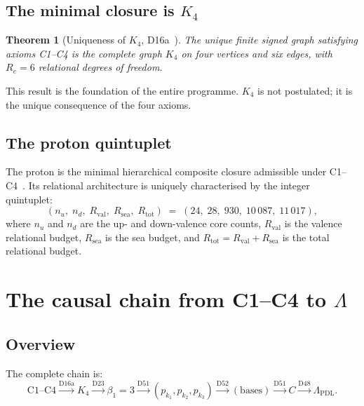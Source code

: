 \documentclass[12pt,a4paper]{article}
\theoremstyle{plain}
\newtheorem{theorem}{Theorem}[section]
\theoremstyle{definition}
\theoremstyle{remark}
\newcommand{\Kfour}{K_4}
\newcommand{\Rtot}{R_{\mathrm{tot}}}
\newcommand{\Rval}{R_{\mathrm{val}}}
\newcommand{\Rsea}{R_{\mathrm{sea}}}
\renewcommand{\Re}{R_e}
\newcommand{\Lam}{\Lambda}
\begin{document}
\subsection{The minimal closure is \texorpdfstring{$\Kfour$}{K4}}
\label{subsec:K4}

\begin{theorem}[Uniqueness of $\Kfour$, D16a~\cite{PDL_D16a_2026}]
\label{thm:K4}
The unique finite signed graph satisfying axioms C1--C4 is the complete graph $\Kfour$ on four vertices and six edges, with $\Re = 6$ relational degrees of freedom.
\end{theorem}

This result is the foundation of the entire programme. $\Kfour$ is not postulated; it is the unique consequence of the four axioms.

\subsection{The proton quintuplet}
\label{subsec:quintuplet}

The proton is the minimal hierarchical composite closure admissible under C1--C4~\cite{PDL_D16b_2026, PDL_D47_2026}. Its relational architecture is uniquely characterised by the integer quintuplet:
\begin{equation}
(n_u,\; n_d,\; \Rval,\; \Rsea,\; \Rtot) \;=\; (24,\; 28,\; 930,\; 10\,087,\; 11\,017),
\label{eq:quintuplet}
\end{equation}
where $n_u$ and $n_d$ are the up- and down-valence core counts, $\Rval$ is the valence relational budget, $\Rsea$ is the sea budget, and $\Rtot = \Rval + \Rsea$ is the total relational budget.

\section{The causal chain from C1--C4 to \texorpdfstring{$\Lambda$}{Lambda}}
\label{sec:chain}

\subsection{Overview}
\label{subsec:overview}

The complete chain is:
\begin{equation}
\mathrm{C1}\text{--}\mathrm{C4}
\xrightarrow{\text{D16a}} \Kfour
\xrightarrow{\text{D23}} \beta_1 = 3
\xrightarrow{\text{D51}} (p_{k_1}, p_{k_2}, p_{k_3})
\xrightarrow{\text{D52}} (\text{bases})
\xrightarrow{\text{D51}} C
\xrightarrow{\text{D48}} \Lam_{\mathrm{PDL}}.
\label{eq:chain}
\end{equation}
\end{document}
